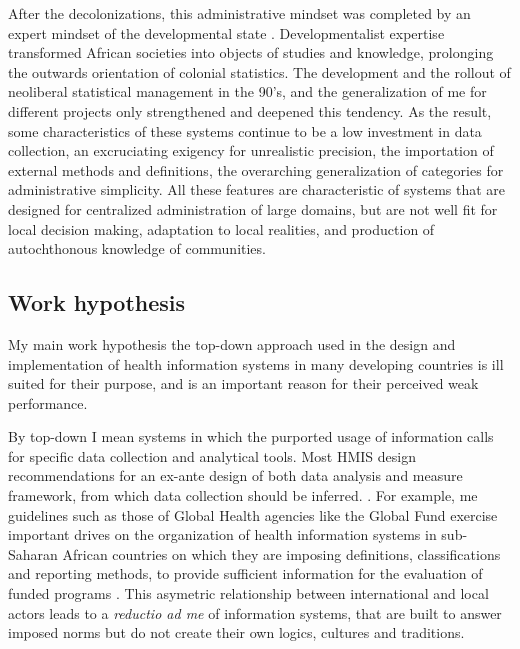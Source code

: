 After the decolonizations, this administrative mindset was completed by an expert mindset of the developmental state \citep{bonneuil_development_2000}. Developmentalist expertise transformed African societies into objects of studies and knowledge, prolonging the outwards orientation of colonial statistics. The development and the rollout of neoliberal statistical management in the 90's, and the generalization of \gls{me} for different projects \citep{desrosieres_prouver_2014} only strengthened and deepened this tendency. As the result, some characteristics of these systems continue to be a low investment in data collection, an excruciating exigency for unrealistic precision, the importation of external methods and definitions, the overarching generalization of categories for administrative simplicity. All these features are characteristic of systems that are designed for centralized administration of large domains, but are not well fit for local decision making, adaptation to local realities, and production of autochthonous knowledge of communities.

\subsection{Work hypothesis}

My main work hypothesis the top-down approach used in the design and implementation of health information systems in many developing countries is ill suited for their purpose, and is an important reason for their perceived weak performance.

By top-down I mean systems in which the purported usage of information calls for specific data collection and analytical tools. Most HMIS design recommendations for an ex-ante design of both data analysis and measure framework, from which data collection should be inferred. \citep{lippeveld_routine_2000,rhino_introducing_2003,daltilia_systeme_2005,health_metrics_network_framework_2008}. For example, \gls{me} guidelines such as those of Global Health agencies like the Global Fund exercise important drives on the organization of health information systems in sub-Saharan African countries on which they are imposing definitions, classifications and reporting methods, to provide sufficient information for the evaluation of funded programs \citep{the_global_fund_global_2014}. This asymetric relationship between international and local actors leads to a    \textit{reductio ad \gls{me}} of information systems, that are built to answer imposed norms but do not create their own logics, cultures and traditions.

